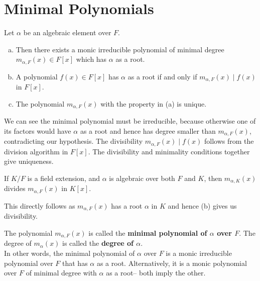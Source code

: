 \documentclass{memoir}
\begin{document}


\section{Minimal Polynomials}
\label{sec:minimal_polynomials}

\begin{prop}
	Let \(\alpha \) be an algebraic element over \(F\).
	\begin{enumerate}[(a).]
		\item Then there exists a monic irreducible polynomial of minimal degree \(m_{\alpha ,F}(x) \in F[x]\) which has \(\alpha \) as a root.
		\item A polynomial \(f(x) \in F[x]\) has \(\alpha \) as a root if and only if \(m_{\alpha ,F}(x) \mid f(x)\) in \(F[x]\).
		\item The polynomial \(m_{\alpha ,F}(x)\) with the property in (a) is unique.
	\end{enumerate}
\end{prop}
We can see the minimal polynomial must be irreducible, because otherwise one of its factors would have \(\alpha \) as a root and hence has degree smaller than \(m_{\alpha ,F}(x)\), contradicting our hypothesis. The divisibility \(m_{\alpha ,F}(x) \mid f(x)\) follows from the division algorithm in \(F[x]\). The divisibility and minimality conditions together give uniqueness.
\begin{cor}
	If \(K / F\) is a field extension, and \(\alpha \) is algebraic over both \(F\) and \(K\), then \(m_{\alpha ,K}(x)\) divides \(m_{\alpha ,F}(x)\) in \(K[x]\).
\end{cor}
This directly follows as \(m_{\alpha ,F}(x)\) has a root \(\alpha \) in \(K\) and hence (b) gives us divisibility.
\begin{defn}
	The polynomial \(m_{\alpha ,F}(x)\) is called the \textbf{minimal polynomial of \(\alpha \) over \(F\)}. The degree of \(m_\alpha (x)\) is called the \textbf{degree of \(\alpha \)}.\\

In other words, the minimal polynomial of \(\alpha \) over \(F\) is a monic irreducible polynomial over \(F\) that has \(\alpha \) as a root. Alternatively, it is a monic polynomial over \(F\) of minimal degree with \(\alpha \) as a root-- both imply the other.
\end{defn}
\end{document}

